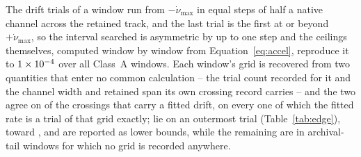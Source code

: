 The drift trials of a window run from $-\dot\nu_{\max}$ in equal steps of
half a native channel across the retained track, and the last trial is the
first at or beyond $+\dot\nu_{\max}$, so the interval searched is asymmetric
by up to one step and the ceilings themselves, computed window by window from
Equation~\ref{eq:accel}, reproduce it to $1\times10^{-4}$ over all
\DriftRelNWin{} Class~A windows. Each window's grid is recovered from two
quantities that enter no common calculation -- the trial count recorded for
it and the channel width and retained span its own crossing record carries --
and the two agree on \EgNGrid{} of the \EgNDrift{} crossings that carry a
fitted drift, on every one of which the fitted rate is a trial of that grid
exactly; \EgNEdge{} lie on an outermost trial (Table~\ref{tab:edge}), toward
\EgEdgeStars, and are reported as lower bounds, while the remaining
\EgNNoGrid{} are in archival-tail windows for which no grid is recorded
anywhere.

\begin{table}
\caption{The crossings whose fitted drift lies on an outermost trial of
their window's own grid, with that grid. Rates are in the observatory
frame.}
\label{tab:edge}
\footnotesize

\end{table}
